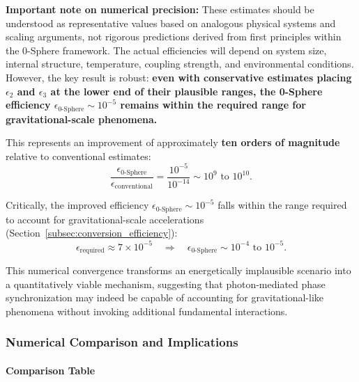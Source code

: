 \documentclass[12pt,letterpaper]{article}
\begin{document}
\textbf{Important note on numerical precision:} These estimates should be understood as representative values based on analogous physical systems and scaling arguments, not rigorous predictions derived from first principles within the 0-Sphere framework. The actual efficiencies will depend on system size, internal structure, temperature, coupling strength, and environmental conditions. However, the key result is robust: \textbf{even with conservative estimates placing $\epsilon_2$ and $\epsilon_3$ at the lower end of their plausible ranges, the 0-Sphere efficiency $\epsilon_{\text{0-Sphere}} \sim 10^{-5}$ remains within the required range for gravitational-scale phenomena.}

This represents an improvement of approximately \textbf{ten orders of magnitude} relative to conventional estimates:
\begin{equation}
\frac{\epsilon_{\text{0-Sphere}}}{\epsilon_{\text{conventional}}} = \frac{10^{-5}}{10^{-14}} \sim 10^{9} \text{ to } 10^{10}.
\end{equation}

Critically, the improved efficiency $\epsilon_{\text{0-Sphere}} \sim 10^{-5}$ falls within the range required to account for gravitational-scale accelerations (Section~\ref{subsec:conversion_efficiency}):
\begin{equation}
\epsilon_{\text{required}} \approx 7 \times 10^{-5} \quad \Rightarrow \quad \epsilon_{\text{0-Sphere}} \sim 10^{-4} \text{ to } 10^{-5}.
\end{equation}

This numerical convergence transforms an energetically implausible scenario into a quantitatively viable mechanism, suggesting that photon-mediated phase synchronization may indeed be capable of accounting for gravitational-like phenomena without invoking additional fundamental interactions.


\subsubsection{Numerical Comparison and Implications}
\label{subsubsec:numerical_comparison}

\paragraph{Comparison Table}
\end{document}
